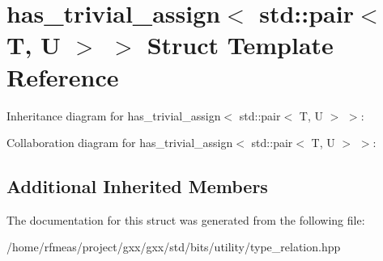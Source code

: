 \hypertarget{structhas__trivial__assign_3_01std_1_1pair_3_01T_00_01U_01_4_01_4}{}\section{has\+\_\+trivial\+\_\+assign$<$ std\+:\+:pair$<$ T, U $>$ $>$ Struct Template Reference}
\label{structhas__trivial__assign_3_01std_1_1pair_3_01T_00_01U_01_4_01_4}


Inheritance diagram for has\+\_\+trivial\+\_\+assign$<$ std\+:\+:pair$<$ T, U $>$ $>$\+:


Collaboration diagram for has\+\_\+trivial\+\_\+assign$<$ std\+:\+:pair$<$ T, U $>$ $>$\+:
\subsection*{Additional Inherited Members}


The documentation for this struct was generated from the following file\+:\begin{DoxyCompactItemize}
\item 
/home/rfmeas/project/gxx/gxx/std/bits/utility/type\+\_\+relation.\+hpp\end{DoxyCompactItemize}

